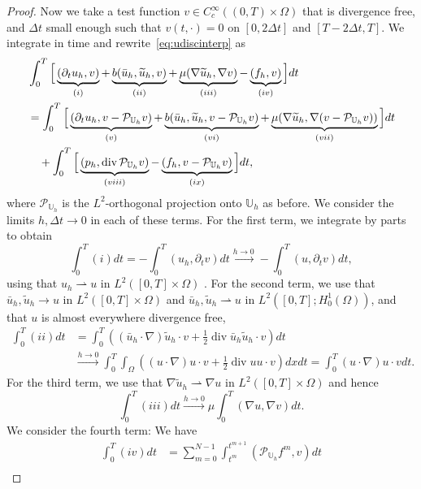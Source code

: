 \documentclass[10pt,letterpaper]{amsart}
\newcommand{\tu}{\widetilde{u}}
\newcommand{\Grad}{\nabla}
\newcommand{\Div}{\operatorname{div}}
\newcommand{\dom}{\Omega}
\newcommand{\Uh}{\mathbb{U}_h}
\newcommand{\weak}{\rightharpoonup}
\newcommand{\PUh}{\mathcal{P}_{\Uh}}
\theoremstyle{definition}{\newtheorem{definition}[lemma]{Definition}}
\numberwithin{equation}{section}
\begin{document}
\begin{proof}
	Now we take a test function $v \in C^\infty_c((0,T)\times \dom)$ that is divergence free, and $\Delta t$ small enough such that $v(t,\cdot)=0$ on $[0,2\Delta t]$ and $[T-2\Delta t, T]$.
	We integrate in time and rewrite~\eqref{eq:udiscinterp} as 
		\begin{align}
			\label{eq:uapp}
			&\int_0^T\Big[\underbrace{\left(\partial_t u_h,v\right)}_{(i)}+ \underbrace{b(\bar{u}_h,\tu_h,v)}_{(ii)}+\underbrace{\mu(\Grad \tu_h,\Grad v)}_{(iii)} -\underbrace{(f_h,v)}_{(iv)}\Big] dt\\
			&=\int_0^T\Big[\underbrace{\left(\partial_t u_h,v-\PUh v\right)}_{(v)}+ \underbrace{b(\bar{u}_h,\tu_h,v-\PUh v)}_{(vi)}+\underbrace{\mu(\Grad \tu_h,\Grad (v-\PUh v))}_{(vii)}\Big] dt\notag\\
			&\quad +\int_0^T\Big[\underbrace{(p_h,\Div \PUh v)}_{(viii)}-\underbrace{(f_h,v-\PUh v)}_{(ix)}\Big] dt,\notag
		\end{align}
	where $\PUh$ is the $L^2$-orthogonal projection onto $\Uh$ as before. We consider the limits $h,\Delta t\to 0$ in each of these terms. For the first term, we integrate by parts to obtain
	\begin{equation*}
		\int_0^T(i) dt = -\int_0^T(u_h,\partial_t v) dt \stackrel{h\to 0}{\longrightarrow}-\int_0^T(u ,\partial_t v) dt ,
	\end{equation*}
	using that $u_h\weak u$ in $L^2([0,T]\times\dom)$ . For the second term, we use that $\bar{u}_h,\tu_h\to u$ in $L^2([0,T]\times\dom)$ and $\bar{u}_h,\tu_h\weak u$ in $L^2([0,T];H^1_0(\dom))$, and that $u$ is almost everywhere divergence free,
	\begin{align*}
		\int_0^T (ii) dt& = \int_0^T \left((\bar{u}_h\cdot\Grad)\tu_h\cdot v +\frac12 \Div\bar{u}_h \tu_h\cdot v\right) dt\\
&	\stackrel{h\to 0}{\longrightarrow} \int_0^T\int_{\dom}\left((u\cdot\Grad) u \cdot v +\frac12\Div u u \cdot v \right) dx dt =  \int_0^T   (u\cdot\Grad) u \cdot v  dt.
	\end{align*}
	For the third term, we use that $\Grad\tu_h\weak \Grad u$ in $L^2([0,T]\times\dom)$ and hence
	\begin{equation*}
		\int_0^T (iii) dt \stackrel{h\to 0}{\longrightarrow}\mu \int_0^T (\Grad u,\Grad v) dt.
	\end{equation*}
	We consider the fourth term: We have
		\begin{equation*}
			\begin{split}
					\int_0^T (iv) dt &= \sum_{m=0}^{N-1}\int_{t^m}^{t^{m+1}} (\PUh f^m,v) dt\\

\end{split}
\end{equation*}
\end{proof}
\end{document}

